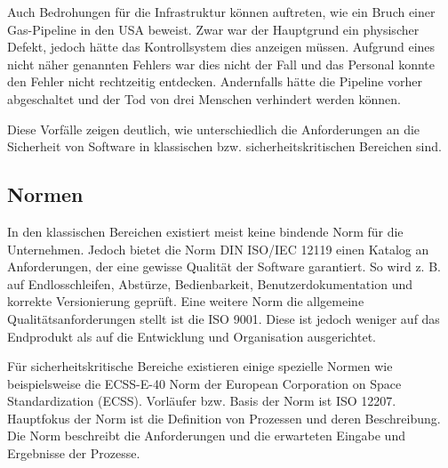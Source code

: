 Auch Bedrohungen für die Infrastruktur können auftreten, wie ein Bruch einer Gas-Pipeline in den USA beweist.
Zwar war der Hauptgrund ein physischer Defekt, jedoch hätte das Kontrollsystem dies anzeigen müssen.
Aufgrund eines nicht näher genannten Fehlers war dies nicht der Fall und das Personal konnte den Fehler nicht rechtzeitig entdecken.
Andernfalls hätte die Pipeline vorher abgeschaltet und der Tod von drei Menschen verhindert werden können.

Diese Vorfälle zeigen deutlich, wie unterschiedlich die Anforderungen an die Sicherheit von Software in klassischen bzw. sicherheitskritischen Bereichen sind.

\subsection{Normen} %

In den klassischen Bereichen existiert meist keine bindende Norm für die Unternehmen.
Jedoch bietet die Norm DIN ISO/IEC 12119 einen Katalog an Anforderungen, der eine gewisse Qualität der Software garantiert.
So wird z. B. auf Endlosschleifen, Abstürze, Bedienbarkeit, Benutzerdokumentation und korrekte Versionierung geprüft. 
Eine weitere Norm die allgemeine Qualitätsanforderungen stellt ist die ISO 9001.
Diese ist jedoch weniger auf das Endprodukt als auf die Entwicklung und Organisation ausgerichtet.
\parencite[Vgl.][S. 66 - 67]{Hohler:1998aa}


Für sicherheitskritische Bereiche existieren einige spezielle Normen wie beispielsweise die ECSS-E-40 Norm der European Corporation on Space Standardization (ECSS).
Vorläufer bzw. Basis der Norm ist ISO 12207.
Hauptfokus der Norm ist die Definition von Prozessen und deren Beschreibung. 
Die Norm beschreibt die Anforderungen und die erwarteten Eingabe und Ergebnisse der Prozesse.

